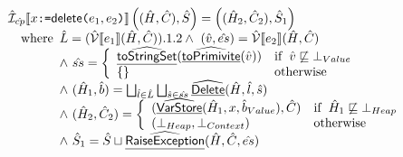 \[\begin{array}{ll}
\hat{\mathcal{I}} _{\hat{cp}}\llbracket x \mbox{\texttt{:=}} \mbox{\textsf{delete}}\mbox{\texttt{(}}e_1,e_2\mbox{\texttt{)}} \rrbracket \left((\hat{H},\hat{C}),\hat{S}\right)
 = \left((\hat{H}_2,\hat{C}_2),\hat{S}_1\right) \\
\quad{\rm where}\begin{array}[t]{l}
  \hat{L}=(\hat{\mathcal{V}}\llbracket e_1\rrbracket(\hat{H},\hat{C})).1.2
  \land\ (\hat{v}, \hat{es}) = \hat{\mathcal{V}}\llbracket e_2\rrbracket(\hat{H},\hat{C}) \\
  \land\ \hat{ss} = 
    \left\{\begin{array}{ll}
      \widehat{\underline{\sf toStringSet}}(\widehat{\underline{\sf toPrimivite}}(\hat{v})) & {\rm if}\begin{array}[t]{l}\hat{v} \not\sqsubseteq \bot_{Value}\end{array} \\
      \{\} & {\rm otherwise} \\
    \end{array}\right. \\
  \land\ (\hat{H}_1,\hat{b}) = \bigsqcup_{\hat{l}\in\hat{L}} \bigsqcup_{\hat{s} \in \hat{ss}} \widehat{\underline{\sf Delete}}(\hat{H},\hat{l},\hat{s}) \\
  \land\ (\hat{H}_2,\hat{C}_2) =
    \left\{\begin{array}{ll}
      (\widehat{\underline{\sf VarStore}}(\hat{H}_1,x,\hat{b}_{Value}),\hat{C}) & {\rm if}\begin{array}[t]{l}\hat{H}_1 \not\sqsubseteq \bot_{Heap}\end{array} \\
      (\bot_{Heap}, \bot_{Context}) & {\rm otherwise} \\
    \end{array}\right. \\
  \land\ \hat{S}_1 = \hat{S}\sqcup\widehat{\underline{\sf RaiseException}}(\hat{H},\hat{C}, \hat{es}) \\
\end{array}\\
\\




\end{array}\]
